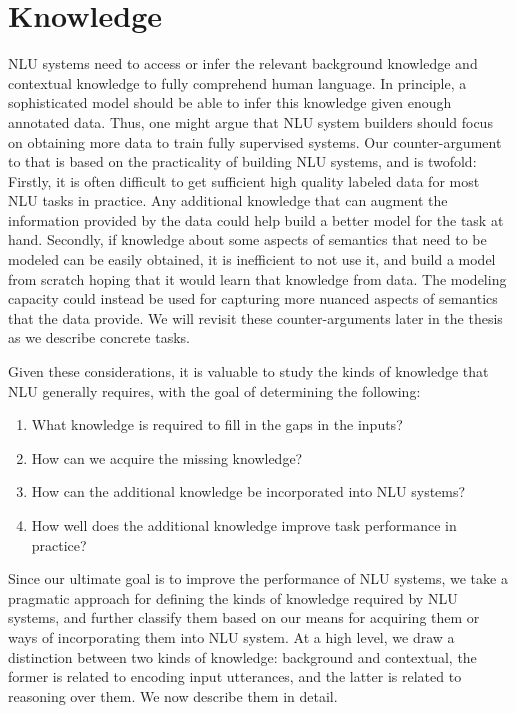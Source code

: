 \section{Knowledge}\label{sec:intro_external_knowledge} 
NLU systems need to access or infer the relevant background knowledge and contextual knowledge
to fully comprehend human language.
In principle, a sophisticated model should be able to infer this knowledge given enough annotated
data. Thus, one might argue that NLU system builders should focus on obtaining more data to train
fully supervised systems. Our counter-argument to that is based on the practicality of building NLU
systems, and is twofold: Firstly, it is often difficult to get sufficient high quality labeled data
for most NLU tasks in practice. Any additional knowledge that can augment the information provided
by the data could help build a better model for the task at hand. Secondly, if knowledge about some
aspects of semantics that need to be modeled can be easily obtained, it is inefficient to not use
it, and build a model from scratch hoping that it would learn that knowledge from data. The modeling capacity
could instead be used for capturing more nuanced aspects of semantics that the data provide. We will
revisit these counter-arguments later in the thesis as we describe concrete tasks.

Given these considerations, it is valuable to study the kinds of knowledge that NLU generally
requires, with the goal of determining the following:
\begin{enumerate}
	\item What knowledge is required to fill in the gaps in the inputs? 
	\item How can we acquire the missing knowledge? 
	\item How can the additional knowledge be incorporated into NLU systems?
	\item How well does the additional knowledge improve task performance in practice?
\end{enumerate}

Since our ultimate goal is to improve the performance of NLU systems, we take a pragmatic approach
for defining the kinds of knowledge required by NLU systems, and further classify them based on our
means for acquiring them or ways of incorporating them into NLU system.  At a high level, we draw a
distinction between two kinds of knowledge: background and contextual, the former is related to
encoding input utterances, and the latter is related to reasoning over them. We now describe them in
detail.

